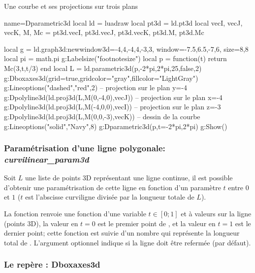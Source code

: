 \begin{demo}{Une courbe et ses projections sur trois plans} 
\begin{luadraw}{name=Dparametric3d}
local ld = luadraw
local pt3d = ld.pt3d
local vecI, vecJ, vecK, M, Mc = pt3d.vecI, pt3d.vecJ, pt3d.vecK, pt3d.M, pt3d.Mc

local g = ld.graph3d:new{window3d={-4,4,-4,4,-3,3}, window={-7.5,6.5,-7,6}, size={8,8}}
local pi = math.pi
g:Labelsize("footnotesize")
local p = function(t) return Mc(3,t,t/3) end
local L = ld.parametric3d(p,-2*pi,2*pi,25,false,2)
g:Dboxaxes3d({grid=true,gridcolor="gray",fillcolor="LightGray"})
g:Lineoptions("dashed","red",2)
-- projection sur le plan y=-4
g:Dpolyline3d(ld.proj3d(L,{M(0,-4,0),vecJ}))
-- projection sur le plan x=-4
g:Dpolyline3d(ld.proj3d(L,{M(-4,0,0),vecI}))
-- projection sur le plan z=-3
g:Dpolyline3d(ld.proj3d(L,{M(0,0,-3),vecK}))
-- dessin de la courbe
g:Lineoptions("solid","Navy",8)
g:Dparametric3d(p,{t={-2*pi,2*pi}})
g:Show()
\end{luadraw}
\end{demo}

\subsubsection{Paramétrisation d'une ligne polygonale: \emph{curvilinear\_param3d}}
Soit $L$ une liste de points 3D représentant une ligne continue, il est possible d'obtenir une paramétrisation de cette ligne en fonction d'un paramètre $t$ entre $0$ et $1$ ($t$ est l'abscisse curviligne divisée par la longueur totale de $L$).

La fonction  renvoie une fonction d'une variable $t\in[0;1]$ et à valeurs sur la ligne  (points 3D), la valeur en $t=0$ est le premier point de , et la valeur en $t=1$ est le dernier point; cette fonction est suivie d'un nombre qui représente la longueur total de . L'argument optionnel  indique si la ligne doit être refermée (\false par défaut).


\subsubsection{Le repère : Dboxaxes3d}

